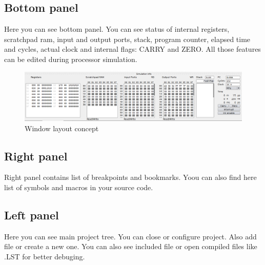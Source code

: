 \subsection{Bottom panel}
    Here you can see bottom panel. You can see status of internal registers, scratchpad ram, input and output ports, stack, program counter, elapsed time and cycles, actual clock and internal flags: CARRY and ZERO. All those features can be edited during processor simulation. 

   \begin{figure}[h!]
        \centering
        \includegraphics[width=\textwidth]{img/bottom_panel.png}
        \caption{Window layout concept}
    \end{figure}

\subsection{Right panel}
    Right panel contains list of breakpoints and bookmarks. Yoou can also find here list of symbols and macros in your source code.
    
\subsection{Left panel}
    Here you can see main project tree. You can close or configure project. Also add file or create a new one. You can also see included file or open
    compiled files like .LST for better debuging.

